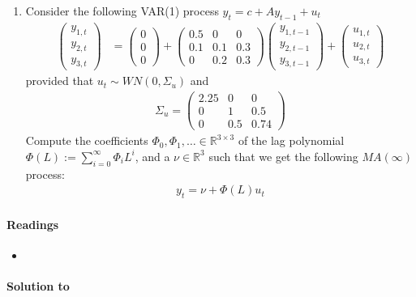 \begin{enumerate}
\item Consider the following VAR{(1)} process \(y_t = c + A y_{t-1} + u_t\)
\begin{align*}
\begin{pmatrix} y_{1,t} \\ y_{2,t} \\ y_{3,t} \end{pmatrix}
&= \begin{pmatrix} 0 \\ 0 \\ 0 \end{pmatrix}
+ \begin{pmatrix} 0.5 & 0 & 0 \\ 0.1 & 0.1 & 0.3 \\ 0 & 0.2 & 0.3 \end{pmatrix}
\begin{pmatrix} y_{1,{t-1}} \\ y_{2,{t-1}} \\ y_{3,{t-1}} \end{pmatrix}
+ \begin{pmatrix} u_{1,t} \\ u_{2,t} \\ u_{3,t} \end{pmatrix}
\end{align*}
provided that \(u_t \sim WN(0,\Sigma_u)\) and
\begin{align*}
\Sigma_u = \begin{pmatrix} 2.25 & 0 & 0 \\ 0 & 1 & 0.5 \\ 0 & 0.5 & 0.74 \end{pmatrix}
\end{align*}
Compute the coefficients \(\Phi_0, \Phi_1, \dots \in \mathbb{R}^{3\times 3}\)
  of the lag polynomial \(\Phi(L) := \sum_{i=0}^\infty \Phi_i L^i\),
  and a \(\nu \in \mathbb{R}^3\) such that we get the following \(MA(\infty)\) process:
\begin{align*}
y_t = \nu + \Phi(L) u_t
\end{align*}

\end{enumerate}

\paragraph{Readings}
\begin{itemize}
\item \textcite[Ch.~2]{Lutkepohl_2005_NewIntroductionMultiple}
\end{itemize}

\begin{solution}\textbf{Solution to }
\ifDisplaySolutions%

\fi
\newpage
\end{solution}